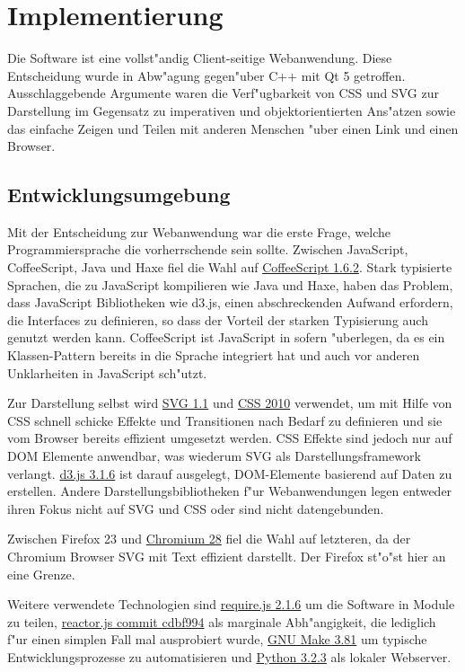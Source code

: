 \section{Implementierung}

Die Software ist eine vollst"andig Client-seitige Webanwendung. Diese
Entscheidung wurde in Abw"agung gegen"uber C++ mit Qt 5 getroffen.
Ausschlaggebende Argumente waren die Verf"ugbarkeit von CSS und SVG zur
Darstellung im Gegensatz zu imperativen und objektorientierten Ans"atzen
sowie das einfache Zeigen und Teilen mit anderen Menschen "uber einen
Link und einen Browser.

\subsection{Entwicklungsumgebung}

Mit der Entscheidung zur Webanwendung war die erste Frage, welche
Programmiersprache die vorherrschende sein sollte. Zwischen JavaScript,
CoffeeScript, Java und Haxe fiel die Wahl auf
\href{http://coffeescript.org/}{CoffeeScript 1.6.2}. Stark typisierte
Sprachen, die zu JavaScript kompilieren wie Java und Haxe, haben das
Problem, dass JavaScript Bibliotheken wie d3.js, einen abschreckenden
Aufwand erfordern, die Interfaces zu definieren, so dass der Vorteil der
starken Typisierung auch genutzt werden kann. CoffeeScript ist
JavaScript in sofern "uberlegen, da es ein Klassen-Pattern bereits in die
Sprache integriert hat und auch vor anderen Unklarheiten in JavaScript
sch"utzt.

Zur Darstellung selbst wird \href{http://www.w3.org/TR/SVG11/}{SVG 1.1}
und \href{http://www.w3.org/TR/css-2010/}{CSS 2010} verwendet, um mit
Hilfe von CSS schnell schicke Effekte und Transitionen nach Bedarf zu
definieren und sie vom Browser bereits effizient umgesetzt werden. CSS
Effekte sind jedoch nur auf DOM Elemente anwendbar, was wiederum SVG
als Darstellungsframework verlangt. \href{http://d3js.org/}{d3.js 3.1.6}
ist darauf ausgelegt, DOM-Elemente basierend auf Daten zu erstellen.
Andere Darstellungsbibliotheken f"ur Webanwendungen legen entweder ihren
Fokus nicht auf SVG und CSS oder sind nicht datengebunden.

Zwischen Firefox 23 und \href{http://www.chromium.org/Home}{Chromium 28}
fiel die Wahl auf letzteren, da der Chromium Browser SVG mit Text effizient
darstellt. Der Firefox st"o"st hier an eine Grenze.

Weitere verwendete Technologien sind
\href{http://requirejs.org/}{require.js 2.1.6} um die Software in Module
zu teilen, \href{https://github.com/fynyky/reactor.js}{reactor.js commit
cdbf994} als marginale Abh"angigkeit, die lediglich f"ur einen simplen
Fall mal ausprobiert wurde,
\href{https://www.gnu.org/software/make/}{GNU Make 3.81} um typische
Entwicklungsprozesse zu automatisieren und
\href{http://python.org/}{Python 3.2.3} als lokaler Webserver.

